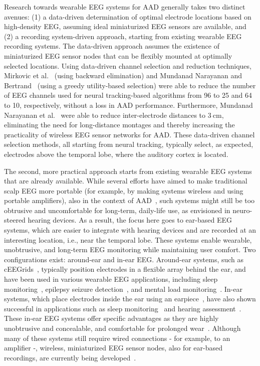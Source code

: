 \documentclass[fleqn,10pt]{wlscirep}
\begin{document}
	Research towards wearable EEG systems for AAD generally takes two distinct avenues: (1) a data-driven determination of optimal electrode locations based on high-density EEG, assuming ideal miniaturized EEG sensors are available, and (2) a recording system-driven approach, starting from existing wearable EEG recording systems. The data-driven approach assumes the existence of miniaturized EEG sensor nodes that can be flexibly mounted at optimally selected locations. Using data-driven channel selection and reduction techniques, Mirkovic et al.~\cite{mirkovic2015decoding} (using backward elimination) and Mundanad Narayanan and Bertrand~\cite{narayanan2020analysis} (using a greedy utility-based selection) were able to reduce the number of EEG channels used for neural tracking-based algorithms from 96 to 25 and 64 to 10, respectively, without a loss in AAD performance. Furthermore, Mundanad Narayanan et al.~\cite{narayanan2021eeg} were able to reduce inter-electrode distances to $\SI{3}{\centi\meter}$, eliminating the need for long-distance montages and thereby increasing the practicality of wireless EEG sensor networks for AAD. These data-driven channel selection methods, all starting from neural tracking, typically select, as expected, electrodes above the temporal lobe, where the auditory cortex is located.
	
	The second, more practical approach starts from existing wearable EEG systems that are already available. While several efforts have aimed to make traditional scalp EEG more portable (for example, by making systems wireless and using portable amplifiers), also in the context of AAD~\cite{ciccarelli2019comparison,straetmans2021neural,ha2023validation,straetmans2024neural,hjortkjaer2025real}, such systems might still be too obtrusive and uncomfortable for long-term, daily-life use, as envisioned in neuro-steered hearing devices. As a result, the focus here goes to ear-based EEG systems, which are easier to integrate with hearing devices and are recorded at an interesting location, i.e., near the temporal lobe. These systems enable wearable, unobtrusive, and long-term EEG monitoring while maintaining user comfort. Two configurations exist: around-ear and in-ear EEG. Around-ear systems, such as cEEGrids~\cite{debener2015unobtrusive,bleichner2017concealed}, typically position electrodes in a flexible array behind the ear, and have been used in various wearable EEG applications, including sleep monitoring~\cite{mikkelsen2019machine}, epilepsy seizure detection~\cite{gu2017comparison}, and mental load monitoring~\cite{cretot2023assessing}. In-ear systems, which place electrodes inside the ear using an earpiece~\cite{looney2012in,mikkelsen2015eeg,kappel2019dry}, have also shown successful in applications such as sleep monitoring~\cite{mikkelsen2019accurate} and hearing assessment~\cite{christensen2018toward}. These in-ear EEG systems offer specific advantages as they are highly unobtrusive and concealable, and comfortable for prolonged wear~\cite{looney2012in}. Although many of these systems still require wired connections - for example, to an amplifier -, wireless, miniaturized EEG sensor nodes, also for ear-based recordings, are currently being developed~\cite{ding2025synchronized}.
	
\end{document}
